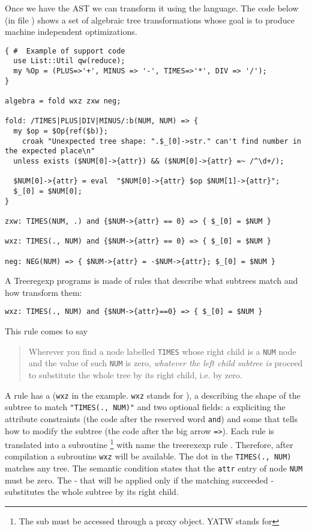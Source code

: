 Once we have the AST we can transform it
using the  language.
The code below (in file )
shows a set of algebraic tree transformations
whose goal is to produce 
machine independent optimizations.
\begin{verbatim}
{ #  Example of support code
  use List::Util qw(reduce);
  my %Op = (PLUS=>'+', MINUS => '-', TIMES=>'*', DIV => '/');
}

algebra = fold wxz zxw neg;

fold: /TIMES|PLUS|DIV|MINUS/:b(NUM, NUM) => { 
  my $op = $Op{ref($b)};
    croak "Unexpected tree shape: ".$_[0]->str." can't find number in the expected place\n" 
  unless exists ($NUM[0]->{attr}) && ($NUM[0]->{attr} =~ /^\d+/);

  $NUM[0]->{attr} = eval  "$NUM[0]->{attr} $op $NUM[1]->{attr}";
  $_[0] = $NUM[0]; 
}

zxw: TIMES(NUM, .) and {$NUM->{attr} == 0} => { $_[0] = $NUM }

wxz: TIMES(., NUM) and {$NUM->{attr} == 0} => { $_[0] = $NUM }

neg: NEG(NUM) => { $NUM->{attr} = -$NUM->{attr}; $_[0] = $NUM }
\end{verbatim}
A Treeregexp programs is made of  rules
that describe what subtrees match and how transform them:
\begin{verbatim}
wxz: TIMES(., NUM) and {$NUM->{attr}==0} => { $_[0] = $NUM }
\end{verbatim}
This rule comes to say 
\begin{quote}
Wherever you find a node labelled \verb|TIMES| whose right
child is a \verb|NUM| node and the value of such \verb|NUM| is
zero, 
\emph{whatever the left child subtree is} proceed to
substitute the whole tree by its right child, i.e. by zero.

\end{quote}

A rule has a  (\verb|wxz| in the example. \verb|wxz|
stands for ), 
a  describing
the shape of the subtree to match \verb|"TIMES(., NUM)"|
and two optional fields:
a  expliciting
the attribute constraints (the code after the reserved word
\verb|and|)
and some  that tells how to 
modify the subtree (the code after the big arrow \verb|=>|).
Each rule is translated into a subroutine 
\footnote{The sub must be accessed 
through a proxy 
 object. YATW stands for }
with name the treerexexp rule .
Therefore, after compilation 
a subroutine \verb|wxz| will be available.
The dot in the  \verb|TIMES(., NUM)| 
matches any tree. The semantic condition
states that the \verb|attr| entry of node
\verb|NUM| must be zero.
The  - that will be 
applied only if the matching succeeded -
substitutes the whole subtree by its 
right child.

